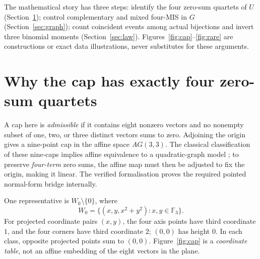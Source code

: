 \documentclass[12pt,a4paper]{article}
\newcommand{\F}{\mathbb F}
\begin{document}
The mathematical story has three steps: identify the four zero-sum quartets of $U$ (Section~\ref{sec:cap}); control complementary and mixed four-MIS in $G$ (Section~\ref{sec:graph}); count coincident events among actual bijections and invert three binomial moments (Section~\ref{sec:law}). Figures~\ref{fig:cap}--\ref{fig:rare} are constructions or exact data illustrations, never substitutes for these arguments.

\section{Why the cap has exactly four zero-sum quartets}\label{sec:cap}
A cap here is \emph{admissible} if it contains eight nonzero vectors and no nonempty subset of one, two, or three distinct vectors sums to zero. Adjoining the origin gives a nine-point cap in the affine space $AG(3,3)$. The classical classification of these nine-caps implies affine equivalence to a quadratic-graph model \cite[Proposition~2.2]{Follett2014}; to preserve \emph{four-term} zero sums, the affine map must then be adjusted to fix the origin, making it linear. The verified formalisation proves the required pointed normal-form bridge internally.

One representative is $W_0\setminus\{0\}$, where
\[
 W_0=\{(x,y,x^2+y^2):x,y\in\F_3\}.
\]
For projected coordinate pairs $(x,y)$, the four axis points have third coordinate $1$, and the four corners have third coordinate $2$; $(0,0)$ has height $0$. In each class, opposite projected points sum to $(0,0)$. Figure~\ref{fig:cap} is a \emph{coordinate table}, not an affine embedding of the eight vectors in the plane.
\end{document}
